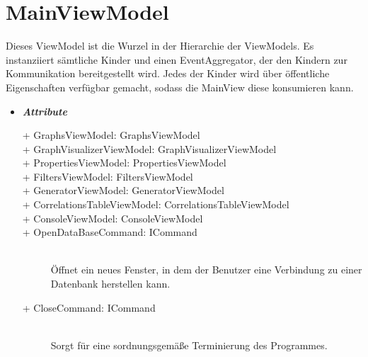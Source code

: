 \documentclass[13pt]{scrreprt}
\begin{document}
	\section{MainViewModel}
	Dieses ViewModel ist die Wurzel in der Hierarchie der ViewModels. Es instanziiert s\"amtliche Kinder und einen EventAggregator, der den Kindern zur Kommunikation bereitgestellt wird. Jedes der Kinder wird \"uber \"offentliche Eigenschaften verf\"ugbar gemacht, sodass die MainView diese konsumieren kann.
	\begin{itemize}[label = {$\circ$}]
		\item {\large \textbf{\textit{Attribute}}\par}
		\begin{description}
			\item [+ GraphsViewModel: GraphsViewModel] \hfill
			\item [+ GraphVisualizerViewModel: GraphVisualizerViewModel] \hfill
			\item [+ PropertiesViewModel: PropertiesViewModel] \hfill
			\item [+ FiltersViewModel: FiltersViewModel] \hfill
			\item [+ GeneratorViewModel: GeneratorViewModel] \hfill
			\item [+ CorrelationsTableViewModel: CorrelationsTableViewModel] \hfill
			\item [+ ConsoleViewModel: ConsoleViewModel] \hfill
			\item [+ OpenDataBaseCommand: ICommand]\hfill \\ \"Offnet ein neues Fenster, in dem der Benutzer eine Verbindung zu einer Datenbank herstellen kann.
			\item [+ CloseCommand: ICommand]\hfill \\ Sorgt f\"ur eine sordnungsgem\"aße Terminierung des Programmes.
		\end{description}
	\end{itemize}
	\newpage
\end{document}
